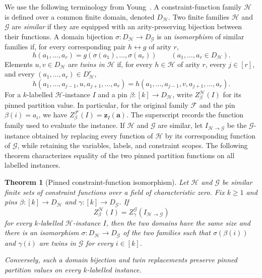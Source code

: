 \documentclass[11pt,letterpaper,onecolumn]{article}
\theoremstyle{plain}
\newtheorem{theorem}{Theorem}[section]
\theoremstyle{definition}
\theoremstyle{remark}
\newcommand{\cF}{\mathcal F}
\newcommand{\zvec}[1]{\mathbf z_{#1}}
\begin{document}
We use the following terminology from
Young~\cite[Definitions~3, 5--7 and Section~4.1]{Young2025}.  A constraint-function
family $\mathcal H$ is defined over a common finite domain, denoted
$D_{\mathcal H}$.  Two finite families $\mathcal H$ and $\mathcal G$ are
\emph{similar} if they are equipped with an arity-preserving bijection between
their functions.  A domain bijection $\sigma:D_{\mathcal H}\to D_{\mathcal G}$
is an \emph{isomorphism} of similar families if, for every corresponding pair
$h\leftrightarrow g$ of arity $r$,
\[
  h(a_1,\ldots,a_r)=g(\sigma(a_1),\ldots,\sigma(a_r))
  \qquad(a_1,\ldots,a_r\in D_{\mathcal H}).
\]
Elements $u,v\in D_{\mathcal H}$ are \emph{twins in $\mathcal H$} if,
for every $h\in\mathcal H$ of arity $r$, every $j\in[r]$, and every
$(a_1,\ldots,a_r)\in D_{\mathcal H}^r$,
\begin{equation*}
 h(a_1,\ldots,a_{j-1},u,a_{j+1},\ldots,a_r)
 =h(a_1,\ldots,a_{j-1},v,a_{j+1},\ldots,a_r).
\end{equation*}
For a $k$-labelled $\mathcal H$-instance $I$ and a pin
$\beta:[k]\to D_{\mathcal H}$, write $Z_{\beta}^{\mathcal H}(I)$ for its
pinned partition value.  In particular, for the original family $\cF$
and the pin $\beta(i)=a_i$, we have $Z_\beta^{\cF}(I)=\zvec I(\mathbf a)$.
The superscript records the function family used to evaluate the instance.
If $\mathcal H$ and $\mathcal G$ are similar, let
$I_{\mathcal H\to\mathcal G}$ be the $\mathcal G$-instance obtained by
replacing every function of $\mathcal H$ by its corresponding function of
$\mathcal G$, while retaining the variables, labels, and constraint scopes.
The following theorem characterizes equality of the two pinned partition
functions on all labelled instances.

\begin{theorem}[Pinned constraint-function isomorphism]
\label{thm:young-pinned}
Let $\mathcal H$ and $\mathcal G$ be similar finite sets of constraint
functions over a field of characteristic zero.  Fix $k\ge1$ and pins
$\beta:[k]\to D_{\mathcal H}$ and $\gamma:[k]\to D_{\mathcal G}$.
If
\begin{equation*}
  Z_{\beta}^{\mathcal H}(I)
  =Z_{\gamma}^{\mathcal G}(I_{\mathcal H\to\mathcal G})
\end{equation*}
for every $k$-labelled $\mathcal H$-instance $I$, then the two
domains have the same size and there is an isomorphism
$\sigma:D_{\mathcal H}\to D_{\mathcal G}$ of the two families such that
$\sigma(\beta(i))$ and $\gamma(i)$ are twins in $\mathcal G$ for every
$i\in[k]$.

Conversely, such a domain bijection and twin replacements preserve pinned
partition values on every $k$-labelled instance.
\end{theorem}
\end{document}
